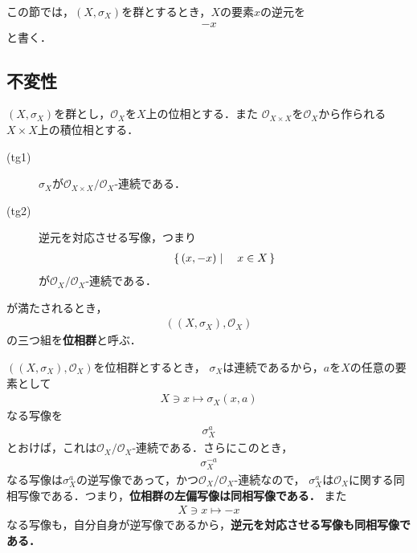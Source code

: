 	この節では，$\left(X,\sigma_X\right)$を群とするとき，$X$の要素$x$の逆元を
	\begin{align}
		-x
	\end{align}
	と書く．
	
\subsection{不変性}
	\begin{screen}
		\begin{dfn}[位相群]\label{def:topological_group}
			$\left(X,\sigma_X\right)$を群とし，$\mathscr{O}_X$を$X$上の位相とする．また
			$\mathscr{O}_{X \times X}$を$\mathscr{O}_X$から作られる$X \times X$上の積位相とする．
			\begin{description}
				\item[(tg1)] $\sigma_X$が$\mathscr{O}_{X \times X}/\mathscr{O}_X$-連続である．
				\item[(tg2)] 逆元を対応させる写像，つまり
					\begin{align}
						\left\{\, (x,-x) \mid \quad x \in X\, \right\}
					\end{align}
					が$\mathscr{O}_X/\mathscr{O}_X$-連続である．
			\end{description}
			が満たされるとき，
			\begin{align}
				\left(\left(X,\sigma_X\right),\mathscr{O}_X\right)
				\label{pair_topological_group}
			\end{align}
			の三つ組を{\bf 位相群}と呼ぶ．
		\end{dfn}
	\end{screen}
	
	$\left(\left(X,\sigma_X\right),\mathscr{O}_X\right)$を位相群とするとき，
	$\sigma_X$は連続であるから，$a$を$X$の任意の要素として
	\begin{align}
		X \ni x \longmapsto \sigma_X(x,a)
	\end{align}
	なる写像を
	\begin{align}
		\sigma_X^a
	\end{align}
	とおけば，これは$\mathscr{O}_X/\mathscr{O}_X$-連続である．さらにこのとき，
	\begin{align}
		\sigma_X^{-a}
	\end{align}
	なる写像は$\sigma_X^a$の逆写像であって，かつ$\mathscr{O}_X/\mathscr{O}_X$-連続なので，
	$\sigma_X^a$は$\mathscr{O}_X$に関する同相写像である．つまり，{\bf 位相群の左偏写像は同相写像である．}
	また
	\begin{align}
		X \ni x \longmapsto -x
	\end{align}
	なる写像も，自分自身が逆写像であるから，{\bf 逆元を対応させる写像も同相写像である．}
	
